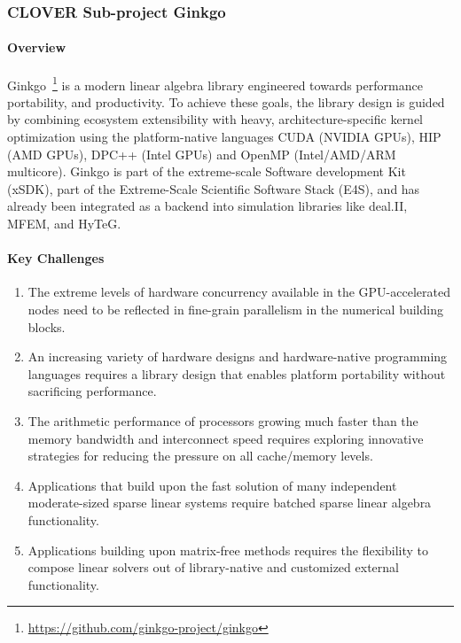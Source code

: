 \subsubsection{ CLOVER Sub-project Ginkgo} \label{subsubsect:peeks}
\paragraph{Overview} 
Ginkgo~\footnote{\url{https://github.com/ginkgo-project/ginkgo}} is a modern
linear algebra library engineered towards performance portability, and
productivity. To achieve these goals, the library design is guided by combining
ecosystem extensibility with heavy, architecture-specific kernel optimization
using the platform-native languages CUDA (NVIDIA GPUs), HIP (AMD GPUs), DPC++
(Intel GPUs) and OpenMP (Intel/AMD/ARM multicore). Ginkgo is part of the
extreme-scale Software development Kit (xSDK), part of the Extreme-Scale
Scientific Software Stack (E4S), and has already been integrated as a backend
into simulation libraries like deal.II, MFEM, and HyTeG.



\paragraph{Key Challenges}
\begin{enumerate}
  \item The extreme levels of hardware concurrency available in the
		GPU-accelerated nodes need to be reflected in fine-grain parallelism in
		the numerical building blocks.
  \item An increasing variety of hardware designs and hardware-native
		programming languages requires a library design that enables platform
		portability without sacrificing performance.
  \item The arithmetic performance of processors growing much faster than the
		memory bandwidth and interconnect speed requires exploring innovative
		strategies for reducing the pressure on all cache/memory levels.
  \item Applications that build upon the fast solution of many independent
		moderate-sized sparse linear systems require batched sparse linear
		algebra functionality.
  \item Applications building upon matrix-free methods requires the flexibility
		to compose linear solvers out of library-native and customized external
		functionality.
\end{enumerate}

